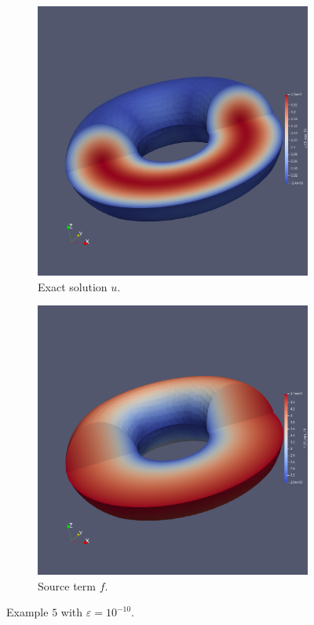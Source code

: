 \documentclass[12pt]{ociamthesis}
\begin{document}
\begin{figure}[H]
 \begin{subfigure}{0.5\textwidth}
     \includegraphics[width=\textwidth]{Pics/uf/U_E5_eps_10.png}
     \caption{Exact solution $u$.}
 \end{subfigure}
   \begin{subfigure}{0.5\textwidth}
     \includegraphics[width=\textwidth]{Pics/uf/F_E5_eps_10.png}
     \caption{Source term $f$.}
 \end{subfigure}
 \caption{Example $5$ with $\varepsilon = 10^{-10}$.} \label{E5_uf}
\end{figure}
\end{document}
